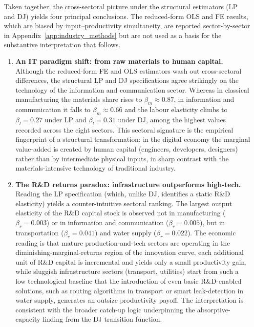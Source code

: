 \documentclass[a4paper, 12pt]{article}
\begin{document}
Taken together, the cross-sectoral picture under the structural estimators (LP and DJ) yields four principal conclusions. The reduced-form OLS and FE results, which are biased by input--productivity simultaneity, are reported sector-by-sector in Appendix~\ref{app:industry_methods} but are not used as a basis for the substantive interpretation that follows.
\begin{enumerate}
    \item \textbf{An IT paradigm shift: from raw materials to human capital.} Although the reduced-form FE and OLS estimators wash out cross-sectoral differences, the structural LP and DJ specifications agree strikingly on the technology of the information and communication sector. Whereas in classical manufacturing the materials share rises to $\beta_m \approx 0.87$, in information and communication it falls to $\beta_m \approx 0.66$ and the labour elasticity climbs to $\beta_l = 0.27$ under LP and $\beta_l = 0.31$ under DJ, among the highest values recorded across the eight sectors. This sectoral signature is the empirical fingerprint of a structural transformation: in the digital economy the marginal value-added is created by human capital (engineers, developers, designers) rather than by intermediate physical inputs, in sharp contrast with the materials-intensive technology of traditional industry.

    \item \textbf{The R\&D returns paradox: infrastructure outperforms high-tech.} Reading the LP specification (which, unlike DJ, identifies a static R\&D elasticity) yields a counter-intuitive sectoral ranking. The largest output elasticity of the R\&D capital stock is observed not in manufacturing ($\beta_r = 0.003$) or in information and communication ($\beta_r = 0.005$), but in transportation ($\beta_r = 0.041$) and water supply ($\beta_r = 0.022$). The economic reading is that mature production-and-tech sectors are operating in the diminishing-marginal-returns region of the innovation curve, each additional unit of R\&D capital is incremental and yields only a small productivity gain, while sluggish infrastructure sectors (transport, utilities) start from such a low technological baseline that the introduction of even basic R\&D-enabled solutions, such as routing algorithms in transport or smart leak-detection in water supply, generates an outsize productivity payoff. The interpretation is consistent with the broader catch-up logic underpinning the absorptive-capacity finding from the DJ transition function.


\end{enumerate}
\end{document}

